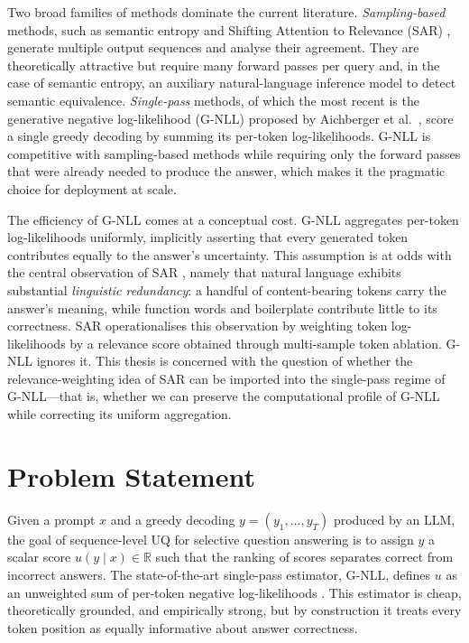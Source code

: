 \documentclass[a4paper,oneside,10pt,ngerman,english]{scrbook}
\begin{document}
Two broad families of methods dominate the current literature. \emph{Sampling-based}
methods, such as semantic entropy \cite{kuhn2023semantic} and Shifting
Attention to Relevance (SAR) \cite{duan2024sar}, generate multiple output
sequences and analyse their agreement. They are theoretically attractive but
require many forward passes per query and, in the case of semantic entropy, an
auxiliary natural-language inference model to detect semantic equivalence.
\emph{Single-pass} methods, of which the most recent is the generative
negative log-likelihood (G-NLL) proposed by Aichberger et
al.~\cite{aichberger2024rethinking}, score a single greedy decoding by summing
its per-token log-likelihoods. G-NLL is competitive with sampling-based
methods while requiring only the forward passes that were already needed to
produce the answer, which makes it the pragmatic choice for deployment at
scale.

The efficiency of G-NLL comes at a conceptual cost. G-NLL aggregates per-token
log-likelihoods uniformly, implicitly asserting that every generated token
contributes equally to the answer's uncertainty. This assumption is at odds
with the central observation of SAR \cite{duan2024sar}, namely that natural
language exhibits substantial \emph{linguistic redundancy}: a handful of
content-bearing tokens carry the answer's meaning, while function words and
boilerplate contribute little to its correctness. SAR operationalises this
observation by weighting token log-likelihoods by a relevance score obtained
through multi-sample token ablation. G-NLL ignores it. This thesis is
concerned with the question of whether the relevance-weighting idea of SAR
can be imported into the single-pass regime of G-NLL---that is, whether we
can preserve the computational profile of G-NLL while correcting its uniform
aggregation.


\section{Problem Statement}
\label{sec:problem}
Given a prompt $x$ and a greedy decoding $y = (y_1, \ldots, y_T)$ produced by
an LLM, the goal of sequence-level UQ for selective question answering is to
assign $y$ a scalar score $u(y \mid x) \in \mathbb{R}$ such that the ranking of
scores separates correct from incorrect answers. The state-of-the-art
single-pass estimator, G-NLL, defines $u$ as an unweighted sum of per-token
negative log-likelihoods \cite{aichberger2024rethinking}. This estimator is
cheap, theoretically grounded, and empirically strong, but by construction it
treats every token position as equally informative about answer correctness.
\end{document}

